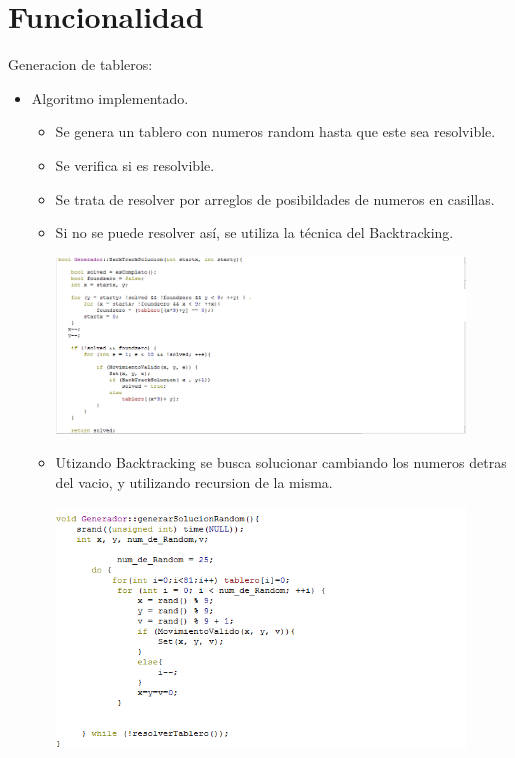 \documentclass[12pt,oneside]{book}
\begin{document}
\chapter{Funcionalidad}
\begin{center} Generacion de tableros:\end{center}
\begin{itemize}
\item  Algoritmo implementado.
\begin{itemize}
	\item Se genera un tablero con numeros random hasta que este sea resolvible.
	\item Se verifica si es resolvible.
	\item Se trata de resolver por arreglos de posibildades de numeros en casillas.
	\item Si no se puede resolver así, se utiliza la técnica del Backtracking. 

	\includegraphics[width=0.9\textwidth]{./imagenes/Codigo_backtrcking.png}

	\item Utizando Backtracking se busca solucionar cambiando los numeros detras del vacio, y utilizando recursion de la misma.

	\includegraphics[width=0.9\textwidth]{./imagenes/codigo_genrador.png}


\end{itemize}
\end{itemize}
\end{document}
